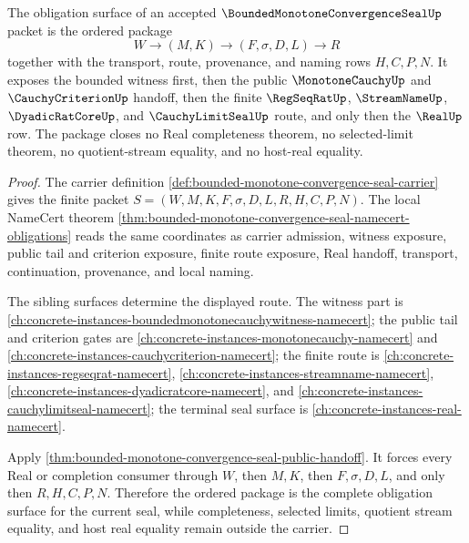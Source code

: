 \begin{theorem}
\label{thm:bounded-monotone-convergence-seal-obligation-package}
The obligation surface of an accepted $\BoundedMonotoneConvergenceSealUp$ packet is the ordered package
$$
W \to (M,K) \to (F,\sigma,D,L) \to R
$$
together with the transport, route, provenance, and naming rows $H,C,P,N$. It exposes the bounded witness first, then the public $\MonotoneCauchyUp$ and $\CauchyCriterionUp$ handoff, then the finite $\RegSeqRatUp$, $\StreamNameUp$, $\DyadicRatCoreUp$, and $\CauchyLimitSealUp$ route, and only then the $\RealUp$ row. The package closes no Real completeness theorem, no selected-limit theorem, no quotient-stream equality, and no host-real equality.
\end{theorem}
\begin{proof}
The carrier definition \autoref{def:bounded-monotone-convergence-seal-carrier} gives the finite packet $S=(W,M,K,F,\sigma,D,L,R,H,C,P,N)$. The local NameCert theorem \autoref{thm:bounded-monotone-convergence-seal-namecert-obligations} reads the same coordinates as carrier admission, witness exposure, public tail and criterion exposure, finite route exposure, Real handoff, transport, continuation, provenance, and local naming.

The sibling surfaces determine the displayed route. The witness part is \autoref{ch:concrete-instances-boundedmonotonecauchywitness-namecert}; the public tail and criterion gates are \autoref{ch:concrete-instances-monotonecauchy-namecert} and \autoref{ch:concrete-instances-cauchycriterion-namecert}; the finite route is \autoref{ch:concrete-instances-regseqrat-namecert}, \autoref{ch:concrete-instances-streamname-namecert}, \autoref{ch:concrete-instances-dyadicratcore-namecert}, and \autoref{ch:concrete-instances-cauchylimitseal-namecert}; the terminal seal surface is \autoref{ch:concrete-instances-real-namecert}.

Apply \autoref{thm:bounded-monotone-convergence-seal-public-handoff}. It forces every Real or completion consumer through $W$, then $M,K$, then $F,\sigma,D,L$, and only then $R,H,C,P,N$. Therefore the ordered package is the complete obligation surface for the current seal, while completeness, selected limits, quotient stream equality, and host real equality remain outside the carrier.
\end{proof}

